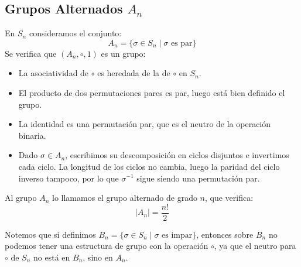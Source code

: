 \subsection{Grupos Alternados $A_n$}
\begin{definicion}
    En $S_n$ consideramos el conjunto:
    \begin{equation*}
        A_n = \{\sigma\in S_n \mid \sigma \text{\ es par}\}
    \end{equation*}
    Se verifica que $(A_n,\circ,1)$ es un grupo:
    \begin{itemize}
        \item La asociatividad de $\circ$ es heredada de la de $\circ$ en $S_n$.
        \item El producto de dos permutaciones pares es par, luego está bien definido el grupo.
        \item La identidad es una permutación par, que es el neutro de la operación binaria.
        \item Dado $\sigma\in A_n$, escribimos su descomposición en ciclos disjuntos e invertimos cada ciclo. La longitud de los ciclos no cambia, luego la paridad del ciclo inverso tampoco, por lo que $\sigma^{-1}$ sigue siendo una permutación par.
    \end{itemize}
    Al grupo $A_n$ lo llamamos el grupo alternado de grado $n$, que verifica:
    \begin{equation*}
        |A_n| = \dfrac{n!}{2}
    \end{equation*}
\end{definicion}


\begin{observacion}
    Notemos que si definimos $B_n = \{\sigma\in S_n \mid \sigma \text{\ es impar}\}$, entonces sobre $B_n$ no podemos tener una estructura de grupo con la operación $\circ$, ya que el neutro para $\circ$ de $S_n$ no está en $B_n$, sino en $A_n$.
\end{observacion}

